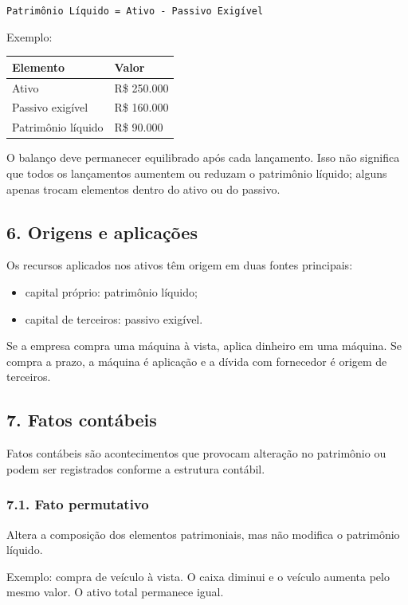 \documentclass[11pt,a4paper]{article}
\begin{document}
\texttt{Patrimônio Líquido = Ativo - Passivo Exigível}

Exemplo:

\begin{tabularx}{\linewidth}{lX}
\toprule
 \textbf{Elemento} & \textbf{Valor} \\
\midrule
 Ativo & R\$ 250.000 \\
 Passivo exigível & R\$ 160.000 \\
 Patrimônio líquido & R\$ 90.000 \\
\bottomrule
\end{tabularx}


O balanço deve permanecer equilibrado após cada lançamento. Isso não significa que todos os lançamentos aumentem ou reduzam o patrimônio líquido; alguns apenas trocam elementos dentro do ativo ou do passivo.

\subsection*{6. Origens e aplicações}

Os recursos aplicados nos ativos têm origem em duas fontes principais:

\begin{itemize}
  \item capital próprio: patrimônio líquido;
  \item capital de terceiros: passivo exigível.
\end{itemize}

Se a empresa compra uma máquina à vista, aplica dinheiro em uma máquina. Se compra a prazo, a máquina é aplicação e a dívida com fornecedor é origem de terceiros.

\subsection*{7. Fatos contábeis}

Fatos contábeis são acontecimentos que provocam alteração no patrimônio ou podem ser registrados conforme a estrutura contábil.

\subsubsection*{7.1. Fato permutativo}

Altera a composição dos elementos patrimoniais, mas não modifica o patrimônio líquido.

Exemplo: compra de veículo à vista. O caixa diminui e o veículo aumenta pelo mesmo valor. O ativo total permanece igual.
\end{document}
